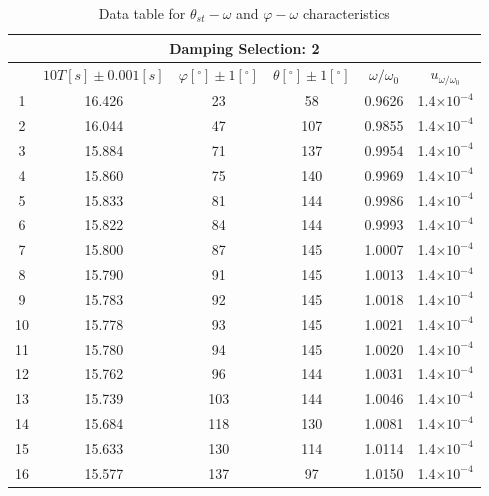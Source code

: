 \documentclass[a4paper,12pt]{article}
\begin{document}
\begin{table}[h]
\begin{center}
\begin{tabular}{|c|c|c|c|c|c|}
\hline
\multicolumn{6}{|c|}{ Damping Selection: 2} \\
\hline
   & $10T [s] \pm 0.001 [s]$ & $\varphi[^\circ] \pm 1 [^\circ]$ & $\theta[^\circ] \pm 1 [^\circ]$ & $\omega/\omega_0$ & $u_{\omega/\omega_0}$\\
\hline
1 & 16.426 & 23 & 58 & 0.9626 & 1.4$\times 10^{-4}$\\
2 & 16.044 & 47 & 107 & 0.9855 & 1.4$\times 10^{-4}$\\
3 & 15.884 & 71 & 137 & 0.9954 & 1.4$\times 10^{-4}$\\
4 & 15.860 & 75 & 140 & 0.9969 & 1.4$\times 10^{-4}$\\
5 & 15.833 & 81 & 144 & 0.9986 & 1.4$\times 10^{-4}$\\
6 & 15.822 & 84 & 144 & 0.9993 & 1.4$\times 10^{-4}$\\
7 & 15.800 & 87 & 145 & 1.0007 & 1.4$\times 10^{-4}$\\
8 & 15.790 & 91 & 145 & 1.0013 & 1.4$\times 10^{-4}$\\
9 & 15.783 & 92 & 145 & 1.0018 & 1.4$\times 10^{-4}$\\
10 & 15.778 & 93 & 145 & 1.0021 & 1.4$\times 10^{-4}$\\
11 & 15.780 & 94 & 145 & 1.0020 & 1.4$\times 10^{-4}$\\
12 & 15.762 & 96 & 144 & 1.0031 & 1.4$\times 10^{-4}$\\
13 & 15.739 & 103 & 144 & 1.0046 & 1.4$\times 10^{-4}$\\
14 & 15.684 & 118 & 130 & 1.0081 & 1.4$\times 10^{-4}$\\
15 & 15.633 & 130 & 114 & 1.0114 & 1.4$\times 10^{-4}$\\
16 & 15.577 & 137 & 97 & 1.0150 & 1.4$\times 10^{-4}$\\
\hline
\end{tabular}
\caption{Data table for $\theta_{st}-\omega$ and $\varphi-\omega$ characteristics}
\end{center}
\end{table}

\newpage
\end{document}
